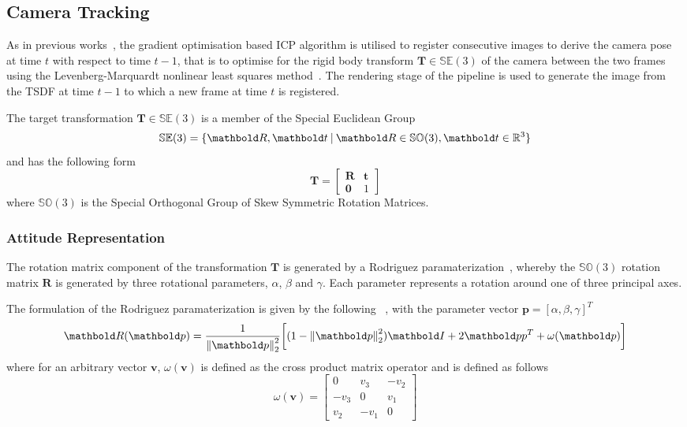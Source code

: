 \subsection{Camera Tracking}
\label{subsec:moseg_static_camera_tracking}
As in previous works~\cite{Newcombe2011, Prisacariu2014}, the gradient
optimisation based ICP algorithm is utilised to register consecutive images
to derive the camera pose at time \(t\) with respect to time \(t-1\), that is to
optimise for the rigid body transform \(\bm{T} \in \mathbb{SE}(3)\) of the
camera between the two frames using the Levenberg-Marquardt nonlinear least
squares method~\cite{NumericalRecipes}. The rendering stage of the pipeline
is used to generate the image from the TSDF at time \(t-1\) to which a new frame
at time \(t\) is registered.

The target transformation \(\bm{T} \in \mathbb{SE}(3)\) is a member of the
Special Euclidean Group
\begin{equation}
  \label{eqn:se3_definition}
  \mathbb{SE}(3) = \{\bm{R}, \bm{t} \given \bm{R} \in
  \mathbb{SO}(3), \bm{t} \in \mathbb{R}^{3}\}
\end{equation}
and has the following form
\begin{equation}
  \label{eqn:trans_mat_definition}
  \bm{T} =
  \begin{bmatrix}
    \bm{R} & \bm{t} \\
    \bm{0} & 1
  \end{bmatrix}
\end{equation}
where \(\mathbb{SO}(3)\) is the Special Orthogonal Group of Skew Symmetric
Rotation Matrices.

\subsubsection{Attitude Representation}
\label{subsub:moseg_static_camera_attitude}
The rotation matrix component of the transformation \(\bm{T}\) is
generated by a Rodriguez paramaterization~\cite{Shuster1993}, whereby the
\(\mathbb{SO}(3)\) rotation matrix \(\bm{R}\) is generated by three rotational
parameters, \(\alpha\), \(\beta\) and \(\gamma\). Each parameter represents a rotation
around one of three principal axes.

The formulation of the Rodriguez paramaterization is given by the following 
~\cite{Shuster1993}, with the parameter vector
\(\bm{p} = [\alpha, \beta, \gamma]^{T}\)
\begin{equation}
  \label{eqn:rodriguez_matrix_eq}
  \bm{R}(\bm{p}) =
  \frac{1}{\norm{\bm{p}}^{2}}
  \bigg[
  (1 - \norm{\bm{p}}^{2})\bm{I} +
  2 \bm{pp}^{T} + \omega(\bm{p})
  \bigg]
\end{equation}
where for an arbitrary vector \(\bm{v}\), \(\omega(\bm{v})\) is defined as
the cross product matrix operator and is defined as follows
\begin{equation}
  \label{eqn:cross_prod_mat}
  \omega(\bm{v}) =
  \begin{bmatrix}
    0 & v_{3} & -v_{2} \\
    -v_{3} & 0 & v_{1} \\
    v_{2} & -v_{1} & 0
  \end{bmatrix}
\end{equation}

